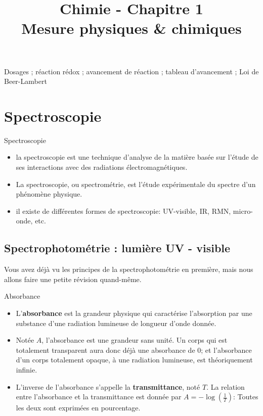 \documentclass[11pt,a4paper]{article}
\title{\large Chimie - Chapitre 1 \\ \LARGE Mesure physiques \& chimiques}
\date{}
\author{}
\begin{document}
\maketitle
\vspace{-1cm}
\begin{tcolorbox}[title=Notions de la classe de première à rappeler]
Dosages ; réaction rédox ; avancement de réaction ; tableau d'avancement ; Loi de Beer-Lambert 
\end{tcolorbox}
\tableofcontents

\section{Spectroscopie}
\begin{defn}{Spectroscopie}
\begin{itemize}
    \item la spectroscopie est une technique d'analyse de la matière basée sur l'étude de ses interactions avec des radiations électromagnétiques. 
    \item La spectroscopie, ou spectrométrie, est l'étude expérimentale du spectre  d'un phénomène physique. 
    \item il existe de différentes formes de spectroscopie: UV-visible, IR, RMN, micro-onde, etc. 
\end{itemize}
\end{defn}



\subsection{Spectrophotométrie : lumière UV - visible}
Vous avez déjà vu les principes de la spectrophotométrie en première, mais nous allons faire une petite révision quand-même. 

\begin{defn}{Absorbance}
\begin{itemize}
    \item L'\textbf{absorbance} est la grandeur physique qui caractérise l'absorption par une substance d'une radiation lumineuse de longueur d'onde donnée. 
    \item Notée $A$, l'absorbance est une grandeur sans unité. Un corps qui est totalement transparent aura donc déjà une absorbance de $0$; et l’absorbance d’un corps totalement opaque, à une radiation lumineuse, est théoriquement infinie. 
    \item L'inverse de l'absorbance s'appelle la \textbf{transmittance}, noté $T$. La relation entre l'absorbance et la transmittance est donnée par $ A = -\log(\frac{1}{T})$:  Toutes les deux sont exprimées en pourcentage. 
\end{itemize}
\end{defn}
\end{document}

